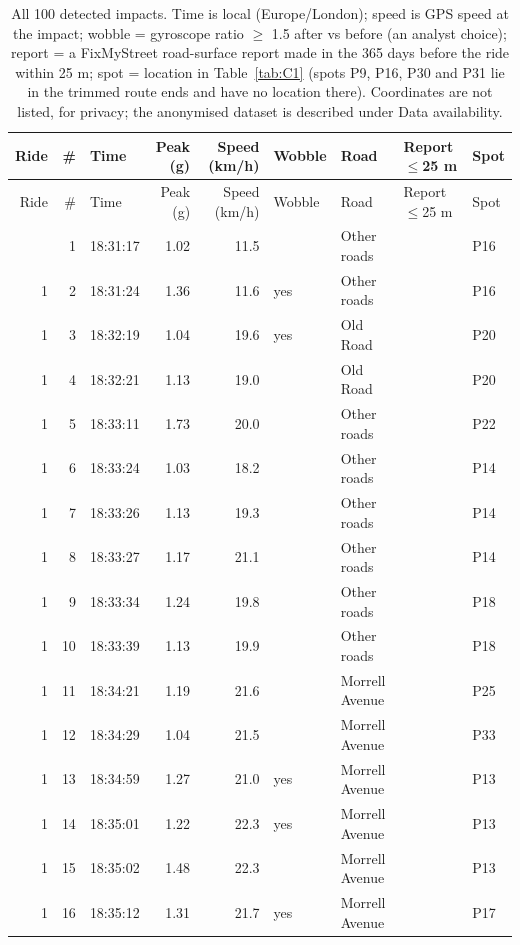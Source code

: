 \begingroup\small
\begin{longtable}{@{}rrlrrllll@{}}
\caption{All 100 detected impacts. Time is local (Europe/London); speed is GPS speed at the impact; wobble = gyroscope ratio $\geq$ 1.5 after vs before (an analyst choice); report = a FixMyStreet road-surface report made in the 365 days before the ride within 25 m; spot = location in Table~\ref{tab:C1} (spots P9, P16, P30 and P31 lie in the trimmed route ends and have no location there). Coordinates are not listed, for privacy; the anonymised dataset is described under Data availability.}\label{tab:Aimpacts}\\
\toprule
Ride & \# & Time & Peak (g) & Speed (km/h) & Wobble & Road & Report $\leq$25 m & Spot \\
\midrule
\endfirsthead
\toprule
Ride & \# & Time & Peak (g) & Speed (km/h) & Wobble & Road & Report $\leq$25 m & Spot \\
\midrule
\endhead
\bottomrule
\endlastfoot
1 & 1 & 18:31:17 & 1.02 & 11.5 &  & Other roads &  & P16 \\
1 & 2 & 18:31:24 & 1.36 & 11.6 & yes & Other roads &  & P16 \\
1 & 3 & 18:32:19 & 1.04 & 19.6 & yes & Old Road &  & P20 \\
1 & 4 & 18:32:21 & 1.13 & 19.0 &  & Old Road &  & P20 \\
1 & 5 & 18:33:11 & 1.73 & 20.0 &  & Other roads &  & P22 \\
1 & 6 & 18:33:24 & 1.03 & 18.2 &  & Other roads &  & P14 \\
1 & 7 & 18:33:26 & 1.13 & 19.3 &  & Other roads &  & P14 \\
1 & 8 & 18:33:27 & 1.17 & 21.1 &  & Other roads &  & P14 \\
1 & 9 & 18:33:34 & 1.24 & 19.8 &  & Other roads &  & P18 \\
1 & 10 & 18:33:39 & 1.13 & 19.9 &  & Other roads &  & P18 \\
1 & 11 & 18:34:21 & 1.19 & 21.6 &  & Morrell Avenue &  & P25 \\
1 & 12 & 18:34:29 & 1.04 & 21.5 &  & Morrell Avenue &  & P33 \\
1 & 13 & 18:34:59 & 1.27 & 21.0 & yes & Morrell Avenue &  & P13 \\
1 & 14 & 18:35:01 & 1.22 & 22.3 & yes & Morrell Avenue &  & P13 \\
1 & 15 & 18:35:02 & 1.48 & 22.3 &  & Morrell Avenue &  & P13 \\
1 & 16 & 18:35:12 & 1.31 & 21.7 & yes & Morrell Avenue &  & P17 \\

\end{longtable}

